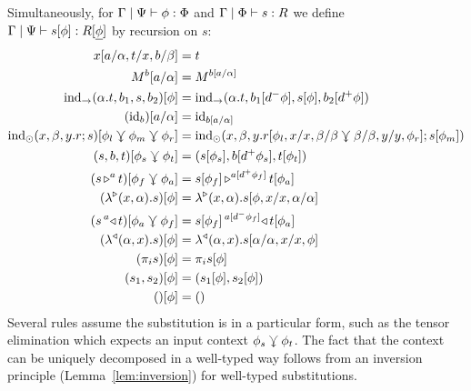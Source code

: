 \documentclass{llncs}
\begin{document}
\begin{definition}
  Simultaneously,
  for
  $\Gamma \pipe \Psi \vdash \phi : \Phi$
  and 
  $\Gamma \pipe \Phi \vdash s : R$ we define\\
  $\Gamma \pipe \Psi \vdash s[\phi] : R [ \underline \phi ]$ by recursion on $s$:
  \begin{align*}
    x[a/\alpha,t/x,b/\beta] &= t\\
    \pendappXtoY M b[a/\alpha] &= \pendappXtoY M {b[a/\alpha]}\\
    {\punitelimkontZatABC {\alpha. t}{b_1} s {b_2}}[\phi] &=
    {\punitelimkontZatABC {\alpha. t}{b_1[d^-\phi]} {s[\phi]} {b_2[d^+\phi]}}\\
    (\punitrefl b)[a/\alpha] &= \punitrefl {b[a/\alpha]}\\
    {\tensorelimWkontZ s {x,\beta,y.r}[\phi_l\jnctx\phi_m\jnctx\phi_r]} &=
    \tensorelimWkontZ {s[\phi_m]} {x,\beta,y. r[\phi_l,x/x,\beta/\beta \jnctx \beta/\beta,y/y,\phi_r]}\\
    {\tensorintroatXwithYandZ b s t}[\phi_s \jnctx \phi_t] &= \tensorintroatXwithYandZ {b[d^+\phi_s]} {s[\phi_s]} {t[\phi_t]}\\
    {(\homrappXtoYatZ s t a)}[\phi_f\jnctx \phi_a] &=
    {\homrappXtoYatZ {s[\phi_f]} {t[\phi_a]} {a[d^+\phi_f]}}\\
    {(\homrlambdaXatYdotZ {x}{\alpha} s)}[\phi] &=
    {\homrlambdaXatYdotZ {x}{\alpha} {s[\phi,x/x,\alpha/\alpha]}}\\
    {(\homlappXtoYatZ t s a)}[\phi_a\jnctx \phi_f] &=
    {\homlappXtoYatZ {t[\phi_a]} {s[\phi_f]} {a[d^-\phi_f]}}\\
    {(\homllambdaXatYdotZ {x}{\alpha} s)}[\phi] &=
    {\homllambdaXatYdotZ {x}{\alpha} {s[\alpha/\alpha,x/x,\phi]}}\\
    (\pi_i s)[\phi] &= \pi_i s[\phi]\\
    (s_1,s_2)[\phi] &= (s_1[\phi], s_2[\phi])\\
    ()[\phi] &= ()
  \end{align*}
  Several rules assume the substitution is in a particular form, such
  as the tensor elimination which expects an input context
  $\phi_s\jnctx\phi_t$. The fact that the context can be uniquely
  decomposed in a well-typed way follows from an inversion principle (Lemma~\ref{lem:inversion})
  for well-typed substitutions.


\end{definition}
\end{document}
